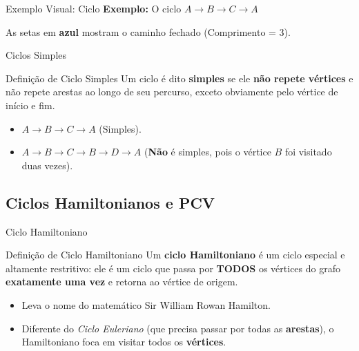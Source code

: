 \documentclass[9pt]{beamer}
\begin{document}
\begin{frame}{Exemplo Visual: Ciclo}
    \textbf{Exemplo:} O ciclo $A \rightarrow B \rightarrow C \rightarrow A$
    \vspace{0.5cm}
    \begin{center}
    \end{center}
    \vspace{0.3cm}
    As setas em \textbf{azul} mostram o caminho fechado (Comprimento = 3).
\end{frame}

\begin{frame}{Ciclos Simples}
    \begin{block}{Definição de Ciclo Simples}
        Um ciclo é dito \textbf{simples} se ele \textbf{não repete vértices} e não repete arestas ao longo de seu percurso, exceto obviamente pelo vértice de início e fim.
    \end{block}
    \vspace{0.5cm}
    \begin{itemize}
        \item $A \rightarrow B \rightarrow C \rightarrow A$ (Simples).
        \item $A \rightarrow B \rightarrow C \rightarrow B \rightarrow D \rightarrow A$ (\textbf{Não} é simples, pois o vértice $B$ foi visitado duas vezes).
    \end{itemize}
\end{frame}

\subsection{Ciclos Hamiltonianos e PCV}
\begin{frame}{Ciclo Hamiltoniano}
    \begin{block}{Definição de Ciclo Hamiltoniano}
        Um \textbf{ciclo Hamiltoniano} é um ciclo especial e altamente restritivo: ele é um ciclo que passa por \textbf{TODOS} os vértices do grafo \textbf{exatamente uma vez} e retorna ao vértice de origem.
    \end{block}
    \vspace{0.5cm}
    \begin{itemize}
        \item Leva o nome do matemático Sir William Rowan Hamilton.
        \item Diferente do \textit{Ciclo Euleriano} (que precisa passar por todas as \textbf{arestas}), o Hamiltoniano foca em visitar todos os \textbf{vértices}.
    \end{itemize}
\end{frame}
\end{document}
